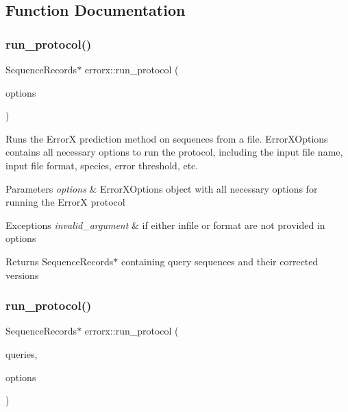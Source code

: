\subsection{Function Documentation}
\mbox{\label{errorx_8hh_file_a33182a2b9ee89b4426ae558a5360bca5}} 
\subsubsection{\texorpdfstring{run\+\_\+protocol()}{run\_protocol()}\hspace{0.1cm}{\footnotesize\ttfamily [1/2]}}
{\footnotesize\ttfamily Sequence\+Records$\ast$ errorx\+::run\+\_\+protocol (\begin{DoxyParamCaption}\item[{\mbox{\hyperlink{classerrorx_1_1_error_x_options}{Error\+X\+Options}} \&}]{options }\end{DoxyParamCaption})}

Runs the ErrorX prediction method on sequences from a file. Error\+X\+Options contains all necessary options to run the protocol, including the input file name, input file format, species, error threshold, etc.


\begin{DoxyParams}{Parameters}
{\em options} & Error\+X\+Options object with all necessary options for running the ErrorX protocol\\
\hline
\end{DoxyParams}

\begin{DoxyExceptions}{Exceptions}
{\em invalid\+\_\+argument} & if either infile or format are not provided in options ~\newline
 \\
\hline
\end{DoxyExceptions}
\begin{DoxyReturn}{Returns}
Sequence\+Records$\ast$ containing query sequences and their corrected versions 
\end{DoxyReturn}
\mbox{\label{errorx_8hh_file_a817846fe4bf6dc67945d9183acab0d0a}} 
\subsubsection{\texorpdfstring{run\+\_\+protocol()}{run\_protocol()}\hspace{0.1cm}{\footnotesize\ttfamily [2/2]}}
{\footnotesize\ttfamily Sequence\+Records$\ast$ errorx\+::run\+\_\+protocol (\begin{DoxyParamCaption}\item[{vector$<$ \mbox{\hyperlink{classerrorx_1_1_sequence_query}{Sequence\+Query}} $>$ \&}]{queries,  }\item[{\mbox{\hyperlink{classerrorx_1_1_error_x_options}{Error\+X\+Options}} \&}]{options }\end{DoxyParamCaption})}

